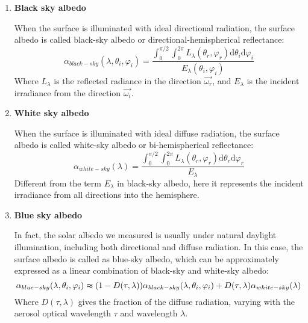 \begin{enumerate}
    \item \textbf{Black sky albedo}

          When the surface is illuminated with ideal directional radiation, the surface albedo is called black-sky albedo or directional-hemispherical reflectance:
          \begin{equation}
              \label{eq_black_sky_albedo}
              \alpha_{black-sky}(\lambda, \theta_i, \varphi_i) = \frac{\int_{0}^{\pi/2} \int_{0}^{2\pi} L_\lambda(\theta_r, \varphi_r) \mathrm{d} \theta_i \mathrm{d} \varphi_i}{E_\lambda(\theta_i, \varphi_i)}
          \end{equation}
          Where $L_\lambda$ is the reflected radiance in the direction $\overrightarrow{\omega_r}$, and $E_\lambda$ is the incident irradiance from the direction $\overrightarrow{\omega_i}$.

    \item \textbf{White sky albedo}

          When the surface is illuminated with ideal diffuse radiation, the surface albedo is called white-sky albedo or bi-hemispherical reflectance:
          \begin{equation}
              \label{eq_white_sky_albedo}
              \alpha_{white-sky}(\lambda) = \frac{\int_{0}^{\pi/2} \int_{0}^{2\pi}L_\lambda(\theta_r, \varphi_r) \mathrm{d} \theta_r \mathrm{d} \varphi_r}{E_\lambda}
          \end{equation}
          Different from the term $E_\lambda$ in black-sky albedo, here it represents the incident irradiance from all directions into the hemisphere.

    \item \textbf{Blue sky albedo}

          In fact, the solar albedo we measured is usually under natural daylight illumination, including both directional and diffuse radiation.
          In this case, the surface albedo is called as blue-sky albedo, which can be approximately expressed as a linear combination of black-sky and white-sky albedo:
          \begin{equation}
              \label{eq_blue_sky_albedo}
              \alpha_{blue-sky}(\lambda, \theta_i, \varphi_i) \thickapprox (1 - D(\tau, \lambda)) \alpha_{black-sky}(\lambda, \theta_i, \varphi_i) + D(\tau, \lambda) \alpha_{white-sky}(\lambda)
          \end{equation}
          Where $D(\tau, \lambda)$ gives the fraction of the diffuse radiation, varying with the aerosol optical wavelength $\tau$ and wavelength $\lambda$.
\end{enumerate}

